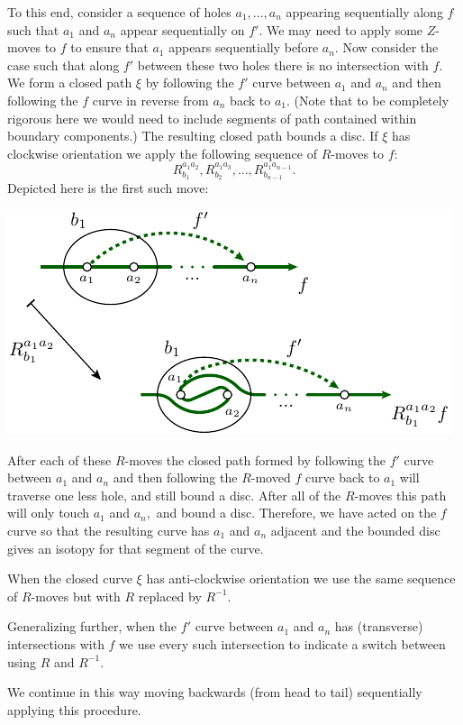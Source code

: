 \documentclass[aps, tightenlines, letterpaper, onecolumn, superscriptaddress, notitlepage, 11pt, groupedaddress]{revtex4-1}
\begin{document}
To this end, consider a sequence of holes $a_1,...,a_n$
appearing sequentially along $f$
such that $a_1$ and $a_n$ appear sequentially on $f'.$
We may need to apply some $Z$-moves to $f$ to ensure
that $a_1$ appears sequentially before $a_n$.
Now consider the case such that
along $f'$ between these two holes there is
no intersection with $f.$
We form a closed path $\xi$ by
following the $f'$ curve between $a_1$ and $a_n$ and then
following the $f$ curve in reverse from $a_n$ back to $a_1.$
(Note that to be completely rigorous here we would need to include segments
of path contained within boundary components.)
The resulting closed path bounds a disc.
If $\xi$ has clockwise orientation %
we apply the following sequence of $R$-moves to $f$:
$$
    R^{a_1a_2}_{b_1}, R^{a_1a_3}_{b_2}, ..., R^{a_1a_{n-1}}_{b_{n-1}}.
$$
Depicted here is the first such move:
\begin{center}
\includegraphics[]{pic-theorem.pdf}
\end{center}
After each of these $R$-moves the closed path
formed by 
following the $f'$ curve between $a_1$ and $a_n$ and then
following the $R$-moved $f$ curve back to $a_1$ will
traverse one less hole, and still bound a disc.
After all of the $R$-moves this path will only
touch $a_1$ and $a_n,$ and bound a disc.
Therefore, we have acted on the $f$ curve so that
the resulting curve has $a_1$ and $a_n$ adjacent
and the bounded disc gives an isotopy for that
segment of the curve.

When the closed curve $\xi$ has anti-clockwise orientation
we use the same sequence of $R$-moves but with $R$ replaced by $R^{-1}.$

Generalizing further,
when the $f'$ curve between $a_1$ and $a_n$ has (transverse) intersections
with $f$ we use every such intersection to indicate a switch
between using $R$ and $R^{-1}.$

We continue in this way moving backwards (from
head to tail) sequentially applying this procedure.
\end{document}

